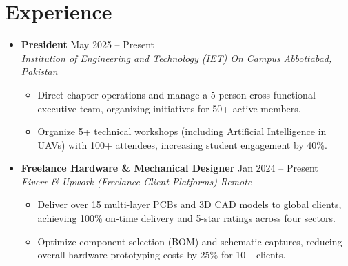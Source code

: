 \documentclass[letterpaper,10pt]{article}
\newcommand{\resumeItem}[1]{\item\small{#1}}
\newcommand{\resumeSubheading}[4]{
  \item
    \textbf{#1} \hfill #2 \\
    \textit{\small#3} \hfill \textit{\small #4}
}
\begin{document}
\section{Experience}
  \begin{itemize}[leftmargin=0in, label={}]
    
    \resumeSubheading
      {President}{May 2025 -- Present}
      {Institution of Engineering and Technology (IET) On Campus}{Abbottabad, Pakistan}
      \vspace{-4pt}
      \begin{itemize}[leftmargin=0.2in, label=\textbullet, itemsep=1pt]
        \resumeItem{Direct chapter operations and manage a 5-person cross-functional executive team, organizing initiatives for 50+ active members.}
        \resumeItem{Organize 5+ technical workshops (including Artificial Intelligence in UAVs) with 100+ attendees, increasing student engagement by 40\%.}
      \end{itemize}
      \vspace{4pt}

    \resumeSubheading
      {Freelance Hardware \& Mechanical Designer}{Jan 2024 -- Present}
      {Fiverr \& Upwork (Freelance Client Platforms)}{Remote}
      \vspace{-4pt}
      \begin{itemize}[leftmargin=0.2in, label=\textbullet, itemsep=1pt]
        \resumeItem{Deliver over 15 multi-layer PCBs and 3D CAD models to global clients, achieving 100\% on-time delivery and 5-star ratings across four sectors.}
        \resumeItem{Optimize component selection (BOM) and schematic captures, reducing overall hardware prototyping costs by 25\% for 10+ clients.}
      \end{itemize}

  \end{itemize}

\end{document}
